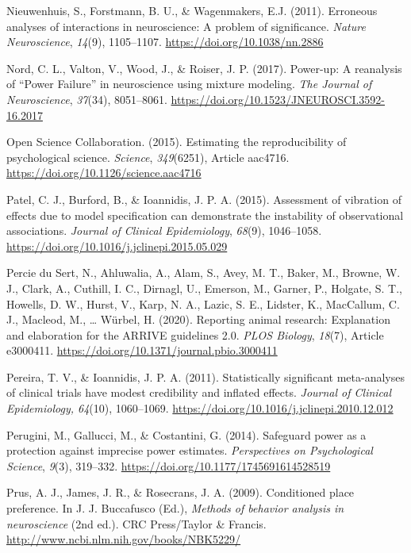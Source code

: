 \documentclass[authordate, meta]{jote-new-article}
\begin{document}
	Nieuwenhuis, S., Forstmann, B. U., \& Wagenmakers, E.J. (2011). Erroneous analyses of interactions in neuroscience: A problem of significance. \emph{Nature Neuroscience}, \emph{14}(9), 1105--1107. \url{https://doi.org/10.1038/nn.2886}



	Nord, C. L., Valton, V., Wood, J., \& Roiser, J. P. (2017). Power-up: A reanalysis of “Power Failure” in neuroscience using mixture modeling. \emph{The Journal of Neuroscience}, \emph{37}(34), 8051--8061. \url{https://doi.org/10.1523/JNEUROSCI.3592-16.2017}



	Open Science Collaboration. (2015). Estimating the reproducibility of psychological science. \emph{Science}, \emph{349}(6251), Article aac4716. \url{https://doi.org/10.1126/science.aac4716}



	Patel, C. J., Burford, B., \& Ioannidis, J. P. A. (2015). Assessment of vibration of effects due to model specification can demonstrate the instability of observational associations. \emph{Journal of Clinical Epidemiology}, \emph{68}(9), 1046--1058. \url{https://doi.org/10.1016/j.jclinepi.2015.05.029}



	Percie du Sert, N., Ahluwalia, A., Alam, S., Avey, M. T., Baker, M., Browne, W. J., Clark, A., Cuthill, I. C., Dirnagl, U., Emerson, M., Garner, P., Holgate, S. T., Howells, D. W., Hurst, V., Karp, N. A., Lazic, S. E., Lidster, K., MacCallum, C. J., Macleod, M., … Würbel, H. (2020). Reporting animal research: Explanation and elaboration for the ARRIVE guidelines 2.0. \emph{PLOS Biology}, \emph{18}(7), Article e3000411. \url{https://doi.org/10.1371/journal.pbio.3000411}



	Pereira, T. V., \& Ioannidis, J. P. A. (2011). Statistically significant meta-analyses of clinical trials have modest credibility and inflated effects. \emph{Journal of Clinical Epidemiology, 64}(10), 1060--1069. \url{https://doi.org/10.1016/j.jclinepi.2010.12.012}



	Perugini, M., Gallucci, M., \& Costantini, G. (2014). Safeguard power as a protection against imprecise power estimates. \emph{Perspectives on Psychological Science}, \emph{9}(3), 319--332. \url{https://doi.org/10.1177/1745691614528519}



	Prus, A. J., James, J. R., \& Rosecrans, J. A. (2009). Conditioned place preference. In J. J. Buccafusco (Ed.), \emph{Methods of behavior analysis in neuroscience} (2nd ed.). CRC Press/Taylor \& Francis. \url{http://www.ncbi.nlm.nih.gov/books/NBK5229/}
\end{document}
